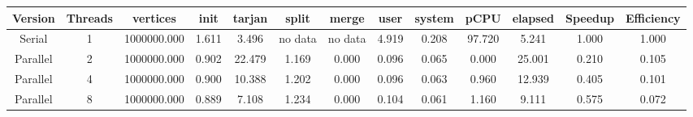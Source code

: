 \begin{tabular}{|c|c|c|c|c|c|c|c|c|c|c|c|c|}
\toprule
 Version &  Threads &    vertices &  init &  tarjan &   split &   merge &  user &  system &   pCPU &  elapsed &  Speedup &  Efficiency \\
\midrule
  Serial &        1 & 1000000.000 & 1.611 &   3.496 & no data & no data & 4.919 &   0.208 & 97.720 &    5.241 &    1.000 &       1.000 \\
Parallel &        2 & 1000000.000 & 0.902 &  22.479 &   1.169 &   0.000 & 0.096 &   0.065 &  0.000 &   25.001 &    0.210 &       0.105 \\
Parallel &        4 & 1000000.000 & 0.900 &  10.388 &   1.202 &   0.000 & 0.096 &   0.063 &  0.960 &   12.939 &    0.405 &       0.101 \\
Parallel &        8 & 1000000.000 & 0.889 &   7.108 &   1.234 &   0.000 & 0.104 &   0.061 &  1.160 &    9.111 &    0.575 &       0.072 \\
\bottomrule
\end{tabular}

